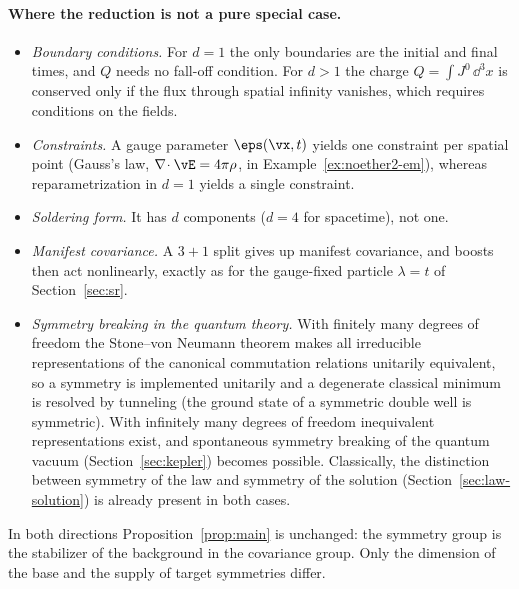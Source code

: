 \paragraph{Where the reduction is not a pure special case.}
\begin{itemize}[leftmargin=1.6em,itemsep=2pt]
\item \emph{Boundary conditions.} For $d=1$ the only boundaries are the initial
  and final times, and $Q$ needs no fall-off condition. For $d>1$ the charge
  $Q=\int J^0\,\dd^3x$ is conserved only if the flux through spatial infinity
  vanishes, which requires conditions on the fields.
\item \emph{Constraints.} A gauge parameter $\eps(\vx,t)$ yields one constraint
  per spatial point (Gauss's law, $\nabla\!\cdot\vE=4\pi\rho$, in
  Example~\ref{ex:noether2-em}), whereas reparametrization in $d=1$ yields a
  single constraint.
\item \emph{Soldering form.} It has $d$ components ($d=4$ for spacetime), not one.
\item \emph{Manifest covariance.} A $3{+}1$ split gives up manifest covariance,
  and boosts then act nonlinearly, exactly as for the gauge-fixed particle
  $\lambda=t$ of Section~\ref{sec:sr}.
\item \emph{Symmetry breaking in the quantum theory.} With finitely many
  degrees of freedom the Stone--von Neumann theorem makes all irreducible
  representations of the canonical commutation relations unitarily
  equivalent, so a symmetry is implemented unitarily and a degenerate classical
  minimum is resolved by tunneling (the ground state of a symmetric double well
  is symmetric). With infinitely many degrees of freedom inequivalent
  representations exist, and spontaneous symmetry breaking of the quantum
  vacuum (Section~\ref{sec:kepler}) becomes possible. Classically, the
  distinction between symmetry of the law and symmetry of the solution
  (Section~\ref{sec:law-solution}) is already present in both cases.
\end{itemize}
In both directions Proposition~\ref{prop:main} is unchanged: the symmetry group
is the stabilizer of the background in the covariance group. Only the
dimension of the base and the supply of target symmetries differ.
